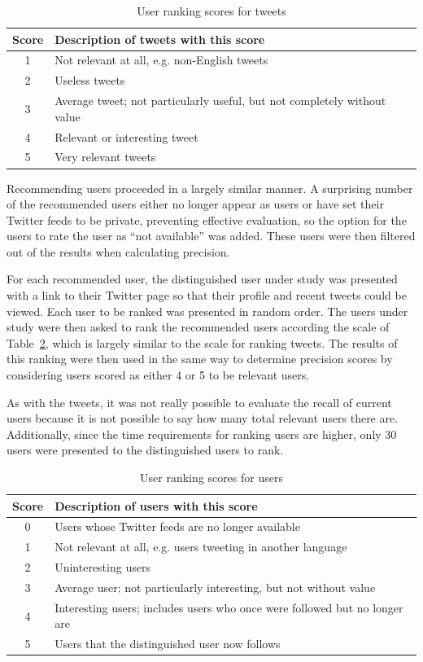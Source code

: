 \begin{table}
\centering
\begin{tabular}{c|l}
{\bf Score} & {\bf Description of tweets with this score} \\ \hline
1 & Not relevant at all, e.g. non-English tweets \\ \hline
2 & Useless tweets \\ \hline
3 & Average tweet; not particularly useful, but not completely without value \\ \hline
4 & Relevant or interesting tweet \\ \hline
5 & Very relevant tweets \\
\end{tabular}
\caption{User ranking scores for tweets}
\label{tab:UserRankingScoresForTweets}
\end{table}


Recommending users proceeded in a largely similar manner. A surprising number of the recommended users either no longer appear as users or have set their Twitter feeds to be private, preventing effective evaluation, so the option for the users to rate the user as ``not available'' was added. These users were then filtered out of the results when calculating precision.

For each recommended user, the distinguished user under study was presented with a link to their Twitter page so that their profile and recent tweets could be viewed. Each user to be ranked was presented in random order. The users under study were then asked to rank the recommended users according the scale of Table~\ref{tab:UserRankingScoresForUsers}, which is largely similar to the scale for ranking tweets. The results of this ranking were then used in the same way to determine precision scores by considering users scored as either 4 or 5 to be relevant users.

As with the tweets, it was not really possible to evaluate the recall of current users because it is not possible to say how many total relevant users there are. Additionally, since the time requirements for ranking users are higher, only 30 users were presented to the distinguished users to rank.


\begin{table}
\centering
\begin{tabular}{c|l}
{\bf Score} & {\bf Description of users with this score} \\ \hline
0 & Users whose Twitter feeds are no longer available \\ \hline
1 & Not relevant at all, e.g. users tweeting in another language \\ \hline
2 & Uninteresting users \\ \hline
3 & Average user; not particularly interesting, but not without value \\ \hline
4 & Interesting users;  includes users who once were followed but no longer are \\ \hline
5 & Users that the distinguished user now follows \\
\end{tabular}
\caption{User ranking scores for users}
\label{tab:UserRankingScoresForUsers}
\end{table}


